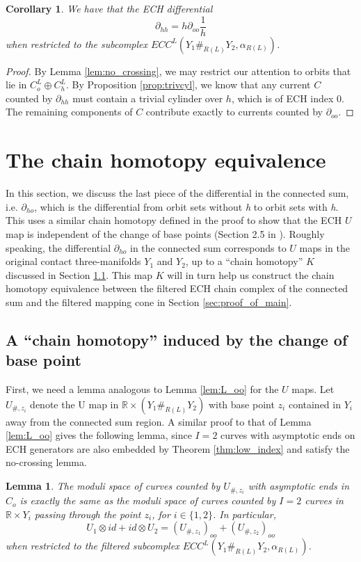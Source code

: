 \documentclass{article}
\numberwithin{equation}{section}
\newtheorem{corollary}[theorem]{Corollary}
\newtheorem{lemma}[theorem]{Lemma}
\theoremstyle{definition}
\newcommand{\R}{\mathbb{R}}
\begin{document}
\begin{corollary}
\label{cor:L_hh}
We have that the ECH differential 
$$\partial_{hh} = h \partial_{oo} \frac{1}{h}$$ 
when restricted to the subcomplex $ECC^L(Y_1 \#_{R(L)} Y_2, \alpha_{R(L)})$.
\end{corollary}
\begin{proof}
    By Lemma \ref{lem:no_crossing}, we may restrict our attention to orbits that lie in $C_o^L \oplus C_h^L$. By Proposition \ref{prop:trivcyl}, we know that any current $C$ counted by $\partial_{hh}$ must contain a trivial cylinder over $h$, which is of ECH index $0$. The remaining components of $C$ contribute exactly to currents counted by $\partial_{oo}$.
\end{proof}




\section{The chain homotopy equivalence}
\label{sec:chain_homotopy}
In this section, we discuss the last piece of the differential in the connected sum, i.e. $\partial_{ho}$, which is the differential from orbit sets without \emph{h} to orbit sets with \emph{h}. This uses a similar chain homotopy defined in the proof to show that the ECH $U$ map is independent of the change of base points (Section 2.5 in \cite{HT_weinstein}). Roughly speaking, the differential $\partial_{ho}$ in the connected sum corresponds to $U$ maps in the original contact three-manifolds $Y_1$ and $Y_2$, up to a ``chain homotopy'' $K$ discussed in Section \ref{sec:partial_ho}. This map $K$ will in turn help us construct the chain homotopy equivalence between the filtered ECH chain complex of the connected sum and the filtered mapping cone in Section \ref{sec:proof_of_main}.


\subsection{A ``chain homotopy'' induced by the change of base point}
\label{sec:partial_ho}
First, we need a lemma analogous to Lemma \ref{lem:L_oo} for the $U$ maps. Let $U_{\#, z_i}$ denote the U map in $\mathbb{R}\times (Y_1 \#_{R(L)} Y_2)$ with base point $z_i$ contained in $Y_i$ away from the connected sum region. A similar proof to that of Lemma \ref{lem:L_oo} gives the following lemma, since $I=2$ curves with asymptotic ends on ECH generators are also embedded by Theorem \ref{thm:low_index} and satisfy the no-crossing lemma.
\begin{lemma}
\label{lem:U_oo}
The moduli space of curves counted by $U_{\#, z_i}$ with asymptotic ends in $C_o$ is exactly the same as the moduli space of curves counted by $I = 2$ curves in $\R \times Y_i$ passing through the point $z_i$, for $i\in \{1,2\}$. In particular, 
$$U_1 \otimes id + id \otimes U_2 = (U_{\#, z_1})_{oo} + (U_{\#, z_2})_{oo}$$ 
when restricted to the filtered subcomplex $ECC^L(Y_1 \#_{R(L)} Y_2, \alpha_{R(L)})$.
\end{lemma}
\end{document}
